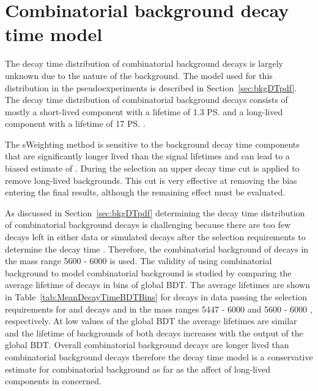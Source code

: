 \section{Combinatorial background decay time model}
\label{sec:CBGdecytimemodel}

The decay time distribution of combinatorial background decays is largely unknown due to the nature of the background. The model used for this distribution in the pseudoexperiments is described in Section~\ref{sec:bkgDTpdf}. The decay time distribution of combinatorial background decays consists of mostly a short-lived component with a lifetime of 1.3 \ps and a long-lived component with a lifetime of 17 \ps.

The sWeighting method is sensitive to the background decay time components that are significantly longer lived than the signal lifetimes and can lead to a biased estimate of \tmumu. 
During the selection an upper decay time cut is applied to remove long-lived backgrounds. This cut is very effective at removing the bias entering the final results, although the remaining effect must be evaluated.

As discussed in Section~\ref{sec:bkgDTpdf} determining the decay time distribution of combinatorial background decays is challenging because there are too few decays left in either data or \bbbarmumux simulated decays after the selection requirements to determine the decay time \pdf. Therefore, the combinatorial background of \bhh decays in the mass range 5600 - 6000 \mevcc is used. The validity of using \bhh combinatorial background to model \bsmumu combinatorial background is studied by comparing the average lifetime of decays in bins of global BDT. The average lifetimes are shown in Table~\ref{tab:MeanDecayTimeBDTBins} for decays in data passing the selection requirements for \bsmumu and \bhh decays and in the mass ranges 5447 - 6000 \mevcc and 5600 - 6000 \mevcc, respectively. At low values of the global BDT the average lifetimes are similar and the lifetime of backgrounds of both decays increases with the output of the global BDT. Overall \bhh combinatorial background decays are longer lived than \bsmumu combinatorial background decays therefore the \bhh decay time model is a conservative estimate for \bsmumu combinatorial background as far as the affect of long-lived components in concerned. 


